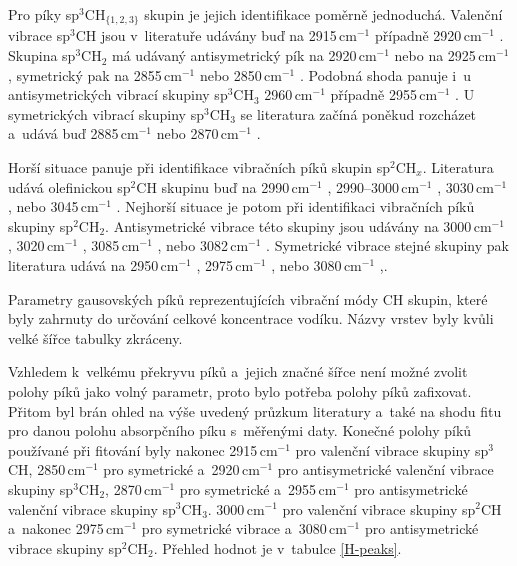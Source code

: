 Pro píky sp$^3$CH$_{\{1,2,3\}}$ skupin je jejich identifikace poměrně jednoduchá. Valenční vibrace sp$^3$CH jsou v~literatuře udávány buď na 2915\,cm$^{-1}$ \cite{Zajickova2011, Dischler1983} případně 2920\,cm$^{-1}$ \cite{Robertson2002, Ristein1998}. Skupina sp$^3$CH$_2$ má udávaný antisymetrický pík na 2920\,cm$^{-1}$ \cite{Dischler1983, Robertson2002, Ristein1998} nebo na 2925\,cm$^{-1}$ \cite{Zajickova2011}, symetrický pak na 2855\,cm$^{-1}$ \cite{Robertson2002, Ristein1998, Zajickova2011} nebo 2850\,cm$^{-1}$ \cite{Dischler1983}. Podobná shoda panuje i~u antisymetrických vibrací skupiny sp$^3$CH$_3$ 2960\,cm$^{-1}$ \cite{Zajickova2011, Dischler1983} případně 2955\,cm$^{-1}$ \cite{Robertson2002, Ristein1998}. U symetrických vibrací skupiny sp$^3$CH$_3$ se literatura začíná poněkud rozcházet a~udává buď 2885\,cm$^{-1}$ \cite{Robertson2002, Ristein1998} nebo 2870\,cm$^{-1}$ \cite{Zajickova2011, Dischler1983}. 

Horší situace panuje při identifikace vibračních píků skupin sp$^2$CH$_x$. Literatura udává olefinickou sp$^2$CH skupinu buď na 2990\,cm$^{-1}$ \cite{Ristein1998}, 2990--3000\,cm$^{-1}$ \cite{Robertson2002}, 3030\,cm$^{-1}$ \cite{Zajickova2011}, nebo 3045\,cm$^{-1}$ \cite{Dischler1983}. Nejhorší situace je potom při identifikaci vibračních píků skupiny sp$^2$CH$_2$. Antisymetrické vibrace této skupiny jsou udávány na 3000\,cm$^{-1}$ \cite{Zajickova2011}, 3020\,cm$^{-1}$ \cite{Dischler1983}, 3085\,cm$^{-1}$ \cite{Robertson2002}, nebo 3082\,cm$^{-1}$ \cite{Ristein1998}. Symetrické vibrace stejné skupiny pak literatura udává na 2950\,cm$^{-1}$ \cite{Dischler1983}, 2975\,cm$^{-1}$ \cite{Robertson2002, Ristein1998}, nebo 3080\,cm$^{-1}$ \cite{Zajickova2011},.

\begin{table}[!tb]
 \centering
 
 \caption{Parametry gausovských píků reprezentujících vibrační módy CH skupin, které byly zahrnuty do určování celkové koncentrace vodíku. Názvy vrstev byly kvůli velké šířce tabulky zkráceny.}
\label{H-peaks}
\end{table}

Vzhledem k~velkému překryvu píků a~jejich značné šířce není možné zvolit polohy píků jako volný parametr, proto bylo potřeba polohy píků zafixovat. Přitom byl brán ohled na výše uvedený průzkum literatury a~také na shodu fitu pro danou polohu absorpčního píku s~měřenými daty. 
Konečné polohy píků používané při fitování byly nakonec 2915\,cm$^{-1}$ pro valenční vibrace skupiny sp$^3$CH, 2850\,cm$^{-1}$ pro symetrické a~2920\,cm$^{-1}$ pro antisymetrické valenční vibrace skupiny sp$^3$CH$_2$, 2870\,cm$^{-1}$ pro symetrické a~2955\,cm$^{-1}$ pro antisymetrické valenční vibrace skupiny sp$^3$CH$_3$. 3000\,cm$^{-1}$ pro valenční vibrace skupiny sp$^2$CH a~nakonec 2975\,cm$^{-1}$ pro symetrické vibrace a~3080\,cm$^{-1}$ pro antisymetrické vibrace skupiny sp$^2$CH$_2$. Přehled hodnot je v~tabulce \ref{H-peaks}.

